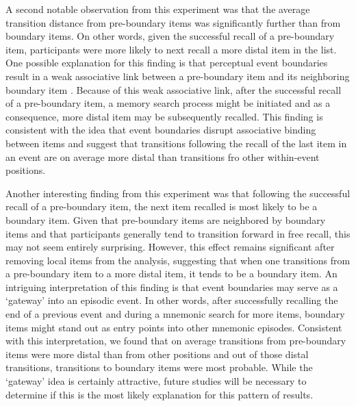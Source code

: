 A second notable observation from this experiment was that the average
transition distance from pre-boundary items was significantly further
than from boundary items. On other words, given the successful recall of
a pre-boundary item, participants were more likely to next recall a more
distal item in the list. One possible explanation for this finding is
that perceptual event boundaries result in a weak associative link
between a pre-boundary item and its neighboring boundary item
\autocites{dubrow_influence_2013}{ezzyat_what_2011}. Because of this
weak associative link, after the successful recall of a pre-boundary
item, a memory search process might be initiated and as a consequence,
more distal item may be subsequently recalled. This finding is
consistent with the idea that event boundaries disrupt associative
binding between items and suggest that transitions following the recall
of the last item in an event are on average more distal than transitions
fro other within-event positions.

Another interesting finding from this experiment was that following the
successful recall of a pre-boundary item, the next item recalled is most
likely to be a boundary item. Given that pre-boundary items are
neighbored by boundary items and that participants generally tend to
transition forward in free recall, this may not seem entirely
surprising. However, this effect remains significant after removing
local items from the analysis, suggesting that when one transitions from
a pre-boundary item to a more distal item, it tends to be a boundary
item. An intriguing interpretation of this finding is that event
boundaries may serve as a `gateway' into an episodic event. In other
words, after successfully recalling the end of a previous event and
during a mnemonic search for more items, boundary items might stand out
as entry points into other mnemonic episodes. Consistent with this
interpretation, we found that on average transitions from pre-boundary
items were more distal than from other positions and out of those distal
transitions, transitions to boundary items were most probable. While the
`gateway' idea is certainly attractive, future studies will be necessary
to determine if this is the most likely explanation for this pattern of
results.

